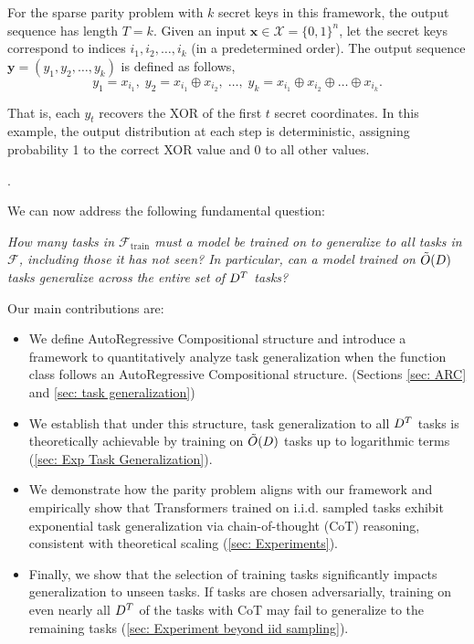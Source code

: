 For the sparse parity problem with \(k\) secret keys in this framework, the output sequence has length \(T = k\). Given an input \(\bm x \in \mathcal{X} = \{0,1\}^n\), let the secret keys correspond to indices \(i_1, i_2, \dots, i_k\) (in a predetermined order). The output sequence \(\bm y = (y_1, y_2, \dots, y_k)\) is defined as follows, 
$$y_1 = x_{i_1}, \; y_2 = x_{i_1} \oplus x_{i_2}, \; \dots, \; y_k = x_{i_1} \oplus x_{i_2} \oplus \dots \oplus x_{i_k}.$$


That is, each \(y_t\) recovers the XOR of the first \(t\) secret coordinates. In this example, the output distribution at each step is deterministic, assigning probability 1 to the correct XOR value and 0 to all other values.


.

\noindent We can now address the following fundamental question: 

\medskip
\textit{How many tasks in \(\mathcal{F}_{\mathrm{train}}\) must a model be trained on to generalize to all tasks in \(\mathcal{F}\), including those it has not seen? In particular, can a model trained on \( \tilde{O}(D) \) tasks generalize across the entire set of \( D^T \) tasks?} 
\medskip

\noindent Our main contributions are:
\begin{itemize}[leftmargin=0.4 cm]
    \item We define AutoRegressive Compositional structure and introduce a framework to quantitatively analyze task generalization when the function class follows an AutoRegressive Compositional structure. (Sections \ref{sec: ARC} and \ref{sec: task generalization})
    
    \item We establish that under this structure, task generalization to all \( D^T \) tasks is theoretically achievable by training on  \( \tilde{O}(D) \) tasks up to logarithmic terms (\cref{sec: Exp Task Generalization}).
    
    \item We demonstrate how the parity problem aligns with our framework and empirically show that Transformers trained on i.i.d. sampled tasks exhibit exponential task generalization via chain-of-thought (CoT) reasoning, consistent with theoretical scaling (\cref{sec: Experiments}).
    
    \item Finally, we show that the selection of training tasks significantly impacts generalization to unseen tasks. If tasks are chosen adversarially, training on even nearly all $D^T$ of the tasks with CoT may fail to generalize to the remaining tasks (\cref{sec: Experiment beyond iid sampling}).\vspace{-3mm}
\end{itemize}






